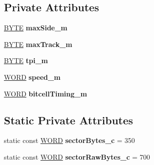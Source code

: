 \subsection*{Private Attributes}
\begin{DoxyCompactItemize}
\item 
\hypertarget{classHeathHSDisk_a7f363659d40b8e0ae7e5002978edd7cb}{}\hyperlink{hi__types_8h_aae9749d96e15ccb4f482dd5f55d98f9b}{B\+Y\+T\+E} {\bfseries max\+Side\+\_\+m}\label{classHeathHSDisk_a7f363659d40b8e0ae7e5002978edd7cb}

\item 
\hypertarget{classHeathHSDisk_ac23c90aea02aae623361f105162e61a1}{}\hyperlink{hi__types_8h_aae9749d96e15ccb4f482dd5f55d98f9b}{B\+Y\+T\+E} {\bfseries max\+Track\+\_\+m}\label{classHeathHSDisk_ac23c90aea02aae623361f105162e61a1}

\item 
\hypertarget{classHeathHSDisk_a32ee619c8b5049531ffc0c538eb0baf2}{}\hyperlink{hi__types_8h_aae9749d96e15ccb4f482dd5f55d98f9b}{B\+Y\+T\+E} {\bfseries tpi\+\_\+m}\label{classHeathHSDisk_a32ee619c8b5049531ffc0c538eb0baf2}

\item 
\hypertarget{classHeathHSDisk_a1ca329a0b3b3f7e52bc7ca7d2df81890}{}\hyperlink{hi__types_8h_ab24077addd3b7b13e086987ff296552c}{W\+O\+R\+D} {\bfseries speed\+\_\+m}\label{classHeathHSDisk_a1ca329a0b3b3f7e52bc7ca7d2df81890}

\item 
\hypertarget{classHeathHSDisk_a61aba7ad38b404609818915f387310fb}{}\hyperlink{hi__types_8h_ab24077addd3b7b13e086987ff296552c}{W\+O\+R\+D} {\bfseries bitcell\+Timing\+\_\+m}\label{classHeathHSDisk_a61aba7ad38b404609818915f387310fb}

\end{DoxyCompactItemize}
\subsection*{Static Private Attributes}
\begin{DoxyCompactItemize}
\item 
\hypertarget{classHeathHSDisk_ab635815a72c273b08b0d5d507a999c5d}{}static const \hyperlink{hi__types_8h_ab24077addd3b7b13e086987ff296552c}{W\+O\+R\+D} {\bfseries sector\+Bytes\+\_\+c} = 350\label{classHeathHSDisk_ab635815a72c273b08b0d5d507a999c5d}

\item 
\hypertarget{classHeathHSDisk_aa5ae51b07c68eec86070d6b9651463ff}{}static const \hyperlink{hi__types_8h_ab24077addd3b7b13e086987ff296552c}{W\+O\+R\+D} {\bfseries sector\+Raw\+Bytes\+\_\+c} = 700\label{classHeathHSDisk_aa5ae51b07c68eec86070d6b9651463ff}

\end{DoxyCompactItemize}


